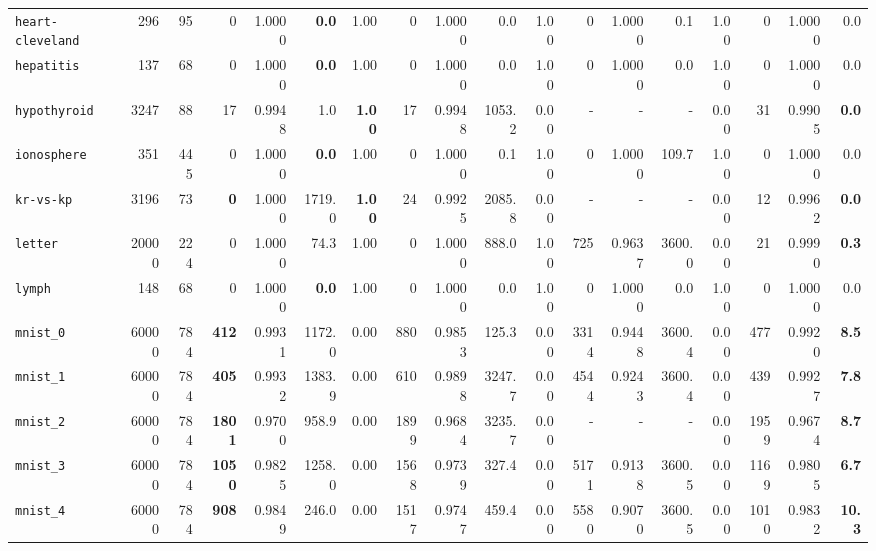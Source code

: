 \begin{tabular}{lccrrrrrrrrrrrrrrr}
\texttt{heart-cleveland} & \multicolumn{1}{r}{296} & \multicolumn{1}{r}{95}  & 0 & 1.0000 & \textbf{0.0} & 1.00 & 0 & 1.0000 & 0.0 & 1.00 & 0 & 1.0000 & 0.1 & 1.00 & 0 & 1.0000 & 0.0\\
\texttt{hepatitis} & \multicolumn{1}{r}{137} & \multicolumn{1}{r}{68}  & 0 & 1.0000 & \textbf{0.0} & 1.00 & 0 & 1.0000 & 0.0 & 1.00 & 0 & 1.0000 & 0.0 & 1.00 & 0 & 1.0000 & 0.0\\
\texttt{hypothyroid} & \multicolumn{1}{r}{3247} & \multicolumn{1}{r}{88}  & 17 & 0.9948 & 1.0 & \textbf{1.00} & 17 & 0.9948 & 1053.2 & 0.00 & - & - & - & 0.00 & 31 & 0.9905 & \textbf{0.0}\\
\texttt{ionosphere} & \multicolumn{1}{r}{351} & \multicolumn{1}{r}{445}  & 0 & 1.0000 & \textbf{0.0} & 1.00 & 0 & 1.0000 & 0.1 & 1.00 & 0 & 1.0000 & 109.7 & 1.00 & 0 & 1.0000 & 0.0\\
\texttt{kr-vs-kp} & \multicolumn{1}{r}{3196} & \multicolumn{1}{r}{73}  & \textbf{0} & 1.0000 & 1719.0 & \textbf{1.00} & 24 & 0.9925 & 2085.8 & 0.00 & - & - & - & 0.00 & 12 & 0.9962 & \textbf{0.0}\\
\texttt{letter} & \multicolumn{1}{r}{20000} & \multicolumn{1}{r}{224}  & 0 & 1.0000 & 74.3 & 1.00 & 0 & 1.0000 & 888.0 & 1.00 & 725 & 0.9637 & 3600.0 & 0.00 & 21 & 0.9990 & \textbf{0.3}\\
\texttt{lymph} & \multicolumn{1}{r}{148} & \multicolumn{1}{r}{68}  & 0 & 1.0000 & \textbf{0.0} & 1.00 & 0 & 1.0000 & 0.0 & 1.00 & 0 & 1.0000 & 0.0 & 1.00 & 0 & 1.0000 & 0.0\\
\texttt{mnist\_0} & \multicolumn{1}{r}{60000} & \multicolumn{1}{r}{784}  & \textbf{412} & 0.9931 & 1172.0 & 0.00 & 880 & 0.9853 & 125.3 & 0.00 & 3314 & 0.9448 & 3600.4 & 0.00 & 477 & 0.9920 & \textbf{8.5}\\
\texttt{mnist\_1} & \multicolumn{1}{r}{60000} & \multicolumn{1}{r}{784}  & \textbf{405} & 0.9932 & 1383.9 & 0.00 & 610 & 0.9898 & 3247.7 & 0.00 & 4544 & 0.9243 & 3600.4 & 0.00 & 439 & 0.9927 & \textbf{7.8}\\
\texttt{mnist\_2} & \multicolumn{1}{r}{60000} & \multicolumn{1}{r}{784}  & \textbf{1801} & 0.9700 & 958.9 & 0.00 & 1899 & 0.9684 & 3235.7 & 0.00 & - & - & - & 0.00 & 1959 & 0.9674 & \textbf{8.7}\\
\texttt{mnist\_3} & \multicolumn{1}{r}{60000} & \multicolumn{1}{r}{784}  & \textbf{1050} & 0.9825 & 1258.0 & 0.00 & 1568 & 0.9739 & 327.4 & 0.00 & 5171 & 0.9138 & 3600.5 & 0.00 & 1169 & 0.9805 & \textbf{6.7}\\
\texttt{mnist\_4} & \multicolumn{1}{r}{60000} & \multicolumn{1}{r}{784}  & \textbf{908} & 0.9849 & 246.0 & 0.00 & 1517 & 0.9747 & 459.4 & 0.00 & 5580 & 0.9070 & 3600.5 & 0.00 & 1010 & 0.9832 & \textbf{10.3}\\

\end{tabular}
